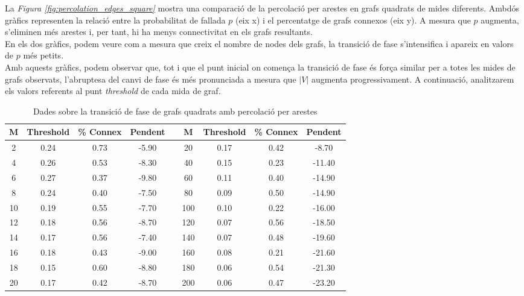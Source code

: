 \documentclass[a4paper]{article}
\begin{document}
	La \textit{Figura \ref{fig:percolation_edges_square}} mostra una comparació de la percolació per arestes en grafs quadrats de mides diferents. Ambdós gràfics representen la relació entre la probabilitat de fallada $p$ (eix x) i el percentatge de grafs connexos (eix y). A mesura que $p$ augmenta, s'eliminen més arestes i, per tant, hi ha menys connectivitat en els grafs resultants. \\
	
	En els dos gràfics, podem veure com a mesura que creix el nombre de nodes dels grafs, la transició de fase s'intensifica i apareix en valors de $p$ més petits. \\
	
	Amb aquests gràfics, podem observar que, tot i que el punt inicial on comença la transició de fase és força similar per a totes les mides de grafs observats, l'abruptesa del canvi de fase és més pronunciada a mesura que $|V|$ augmenta progressivament. A continuació, analitzarem els valors referents al punt \textit{threshold} de cada mida de graf.
	
	\begin{table}[H]
		\centering
		\begin{tabular}{|c|c|c|c|c|c|c|c|c|}
			\hline
			\rowcolor{gray!30}
			M & Threshold & \% Connex & Pendent &   & M & Threshold & \% Connex & Pendent \\ \hline
			2 & 0.24 & 0.73 & -5.90 &   &  20 & 0.17 & 0.42 & -8.70 \\ \hline
			4 & 0.26 & 0.53 & -8.30 &   &  40 & 0.15 & 0.23 & -11.40 \\ \hline
			6 & 0.27 & 0.37 & -9.80 &   &  60 & 0.11 & 0.40 & -14.90 \\ \hline
			8 & 0.24 & 0.40 & -7.50 &   &  80 & 0.09 & 0.50 & -14.90 \\ \hline
			10 & 0.19 & 0.55 & -7.70 &   &  100 & 0.10 & 0.22 & -16.00 \\ \hline
			12 & 0.18 & 0.56 & -8.70 &   &  120 & 0.07 & 0.56 & -18.50 \\ \hline
			14 & 0.17 & 0.56 & -7.40 &   &  140 & 0.07 & 0.48 & -19.60 \\ \hline
			16 & 0.18 & 0.43 & -9.00 &   &  160 & 0.08 & 0.21 & -21.60 \\ \hline
			18 & 0.15 & 0.60 & -8.80 &   &  180 & 0.06 & 0.54 & -21.30 \\ \hline
			20 & 0.17 & 0.42 & -8.70 &   &  200 & 0.06 & 0.47 & -23.20 \\ \hline
		\end{tabular}
		\caption{Dades sobre la transició de fase de grafs quadrats amb percolació per arestes}
		\label{tab:data_edges_square}
	\end{table}
	
\end{document}
